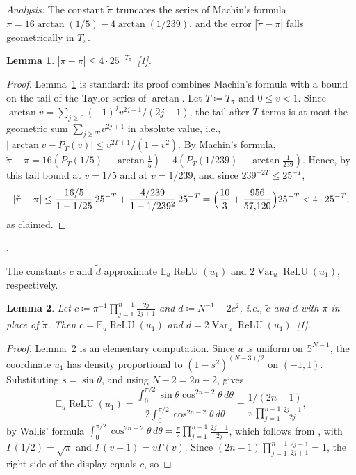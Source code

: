 \documentclass[10pt]{article}
\newcommand{\leanmark}[1]{{\relscale{0.78}\color{gray}[#1]}}
\newenvironment{leanitems}{\par\smallskip\relscale{0.78}\color{gray}\hypersetup{urlcolor=gray}\raggedright%
  \begin{list}{}{\setlength{\leftmargin}{2em}\setlength{\labelwidth}{1.6em}%
  \setlength{\labelsep}{0.4em}\setlength{\itemsep}{0pt}\setlength{\topsep}{0pt}%
  \setlength{\parsep}{0pt}}}{\end{list}\par\medskip}
\newtheorem{lemma}{Lemma}
\newcommand{\SSS}{\mathbb{S}}\newcommand{\Kk}{\mathcal{K}}\newcommand{\Nn}{\mathcal{N}}\newcommand{\Bb}{\mathcal{B}}
\newcommand{\EE}{\mathbb{E}}
\newcommand{\relu}{\operatorname{ReLU}}
\begin{document}
\begin{enumerate}[leftmargin=*,itemsep=8pt,topsep=10pt plus 2pt]
  \emph{Analysis:} The constant $\tilde\pi$ truncates the series of Machin's
  formula $\pi=16\arctan(1/5)-4\arctan(1/239)$, and the error $|\tilde\pi-\pi|$ falls
  geometrically in $T_\pi$.
  \begin{lemma}\label{lem:pi}
    $|\tilde\pi-\pi|\le4\cdot25^{-T_\pi}$~\leanmark{1}.
  \end{lemma}
  \begin{proof}
  Lemma~\ref{lem:pi} is standard: its proof combines Machin's formula with a
  bound on the tail of the Taylor series of $\arctan$. Let
  $T\coloneqq T_\pi$ and $0\le v<1$. Since
  $\arctan v=\sum_{j\ge0}(-1)^jv^{2j+1}/(2j+1)$, the tail after $T$ terms is
  at most the geometric sum $\sum_{j\ge T}v^{2j+1}$ in absolute value, i.e.,
  $|\arctan v-P_T(v)|\le v^{2T+1}/(1-v^2)$. By Machin's formula,
  $\tilde\pi-\pi=16(P_T(1/5)-\arctan\tfrac15)-4(P_T(1/239)-\arctan\tfrac1{239})$.
  Hence, by this tail bound at $v=1/5$ and at $v=1/239$, and since
  $239^{-2T}\le25^{-T}$,
  \[|\tilde\pi-\pi|\le\frac{16/5}{1-1/25}\,25^{-T}+\frac{4/239}{1-1/239^2}\,25^{-T}
  =\Bigl(\frac{10}{3}+\frac{956}{57{,}120}\Bigr)25^{-T}<4\cdot25^{-T},\]
  as claimed.
  \end{proof}
  \begin{leanitems}
  .
  \end{leanitems}
  The constants $\tilde c$ and $\tilde d$ approximate $\EE_u\relu(u_1)$ and
  $2\operatorname{Var}_u\relu(u_1)$, respectively.
  \begin{lemma}\label{lem:cd}
    Let $c\coloneqq\pi^{-1}\prod_{j=1}^{n-1}\frac{2j}{2j+1}$ and
    $d\coloneqq N^{-1}-2c^2$, i.e., $\tilde c$ and $\tilde d$
    with $\pi$ in place of $\tilde\pi$. Then $c=\EE_u\relu(u_1)$ and
    $d=2\operatorname{Var}_u\relu(u_1)$~\leanmark{1}.
  \end{lemma}
  \begin{proof}
  Lemma~\ref{lem:cd} is an elementary computation. Since $u$ is uniform on $\SSS^{N-1}$, the coordinate $u_1$ has density
  proportional to $(1-s^2)^{(N-3)/2}$ on $(-1,1)$. Substituting
  $s=\sin\theta$, and using $N-2=2n-2$, gives
  \[\EE_u\relu(u_1)=\frac{\int_0^{\pi/2}\sin\theta\cos^{2n-2}\theta\,d\theta}
  {2\int_0^{\pi/2}\cos^{2n-2}\theta\,d\theta}
  =\frac{1/(2n-1)}{\pi\prod_{j=1}^{n-1}\frac{2j-1}{2j}},\]
  by Wallis' formula $\int_0^{\pi/2}\cos^{2n-2}\theta\,d\theta
  =\frac\pi2\prod_{j=1}^{n-1}\frac{2j-1}{2j}$, which follows from
  \citet[eqs.~5.12.1--5.12.2]{dlmf}, with $\Gamma(1/2)=\sqrt\pi$ and $\Gamma(v+1)=v\Gamma(v)$. Since
  $(2n-1)\prod_{j=1}^{n-1}\frac{2j-1}{2j+1}=1$, the right side of the display equals $c$, so

\end{proof}
\end{enumerate}
\end{document}
